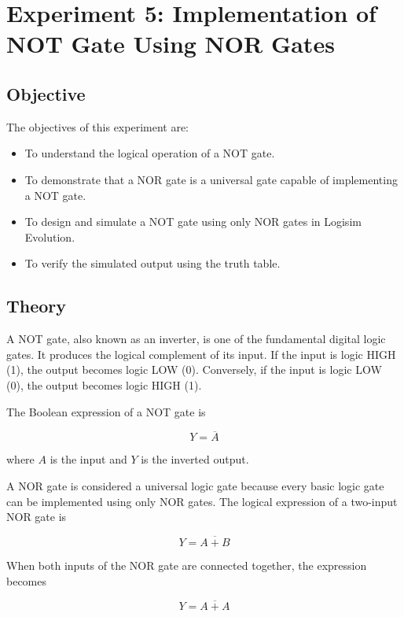 \documentclass[12pt,a4paper]{article}
\begin{document}
\section{Experiment 5: Implementation of NOT Gate Using NOR Gates}

\subsection{Objective}

The objectives of this experiment are:

\begin{itemize}
    \item To understand the logical operation of a NOT gate.
    \item To demonstrate that a NOR gate is a universal gate capable of implementing a NOT gate.
    \item To design and simulate a NOT gate using only NOR gates in Logisim Evolution.
    \item To verify the simulated output using the truth table.
\end{itemize}


\subsection{Theory}

A NOT gate, also known as an inverter, is one of the fundamental digital logic gates. It produces the logical complement of its input. If the input is logic HIGH (1), the output becomes logic LOW (0). Conversely, if the input is logic LOW (0), the output becomes logic HIGH (1).

The Boolean expression of a NOT gate is

\[
Y=\overline{A}
\]

where $A$ is the input and $Y$ is the inverted output.

A NOR gate is considered a universal logic gate because every basic logic gate can be implemented using only NOR gates. The logical expression of a two-input NOR gate is

\[
Y=\overline{A+B}
\]

When both inputs of the NOR gate are connected together, the expression becomes

\[
Y=\overline{A+A}
\]
\end{document}
